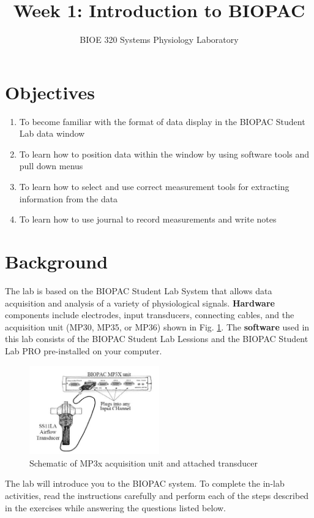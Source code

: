 \documentclass{article}
\title{Week 1: Introduction to BIOPAC}
\author{BIOE 320 Systems Physiology Laboratory}
\date{}
\begin{document}
\large
\maketitle

\section*{Objectives}
\begin{enumerate}
	\item To become familiar with the format of data display in the BIOPAC Student Lab data window
	\item To learn how to position data within the window by using software tools and pull down menus
	\item To learn how to select and use correct measurement tools for extracting information from the data
	\item To learn how to use journal to record measurements and write notes
\end{enumerate}

\section*{Background}
The lab is based on the BIOPAC Student Lab System that allows data acquisition and analysis of a variety of physiological signals. \textbf{Hardware} components include electrodes, input transducers, connecting cables, and the acquisition unit (MP30, MP35, or MP36) shown in Fig. \ref{basic_scheme}. The \textbf{software} used in this lab consists of the BIOPAC Student Lab Lessions and the BIOPAC Student Lab PRO pre-installed on your computer.

\begin{figure}[h]
\includegraphics[width=0.5\textwidth]{../images/BIOPAC_1.jpg}
\centering
\caption{Schematic of MP3x acquisition unit and attached transducer}
\label{basic_scheme}
\end{figure}

The lab will introduce you to the BIOPAC system. To complete the in-lab activities, read the instructions carefully and perform each of the steps described in the exercises while answering the questions listed below. 
\end{document}
